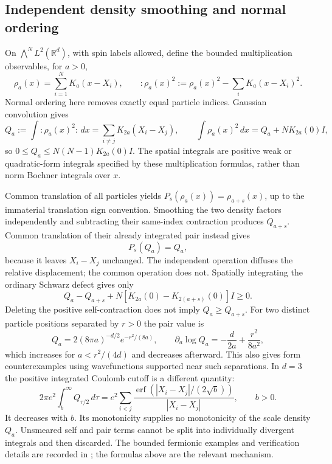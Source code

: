 \documentclass[11pt]{article}
\numberwithin{equation}{section}
\theoremstyle{definition}
\theoremstyle{remark}
\begin{document}
\subsection{Independent density smoothing and normal ordering}
On $\bigwedge^N L^2(\mathbb R^d)$, with spin labels allowed, define
the bounded multiplication observables, for $a>0$,
\begin{equation}
 \rho_a(x)=\sum_{i=1}^NK_a(x-X_i),\qquad
 :\rho_a(x)^2:=\rho_a(x)^2-\sum_i K_a(x-X_i)^2.
\end{equation}
Normal ordering here removes exactly equal particle indices.  Gaussian
convolution gives
\begin{equation}\label{eq:normal-pair-Q}
 Q_a:=\int:\rho_a(x)^2:\,dx
 =\sum_{i\ne j}K_{2a}(X_i-X_j),\qquad
 \int\rho_a(x)^2\,dx=Q_a+NK_{2a}(0)I,
\end{equation}
so $0\le Q_a\le N(N-1)K_{2a}(0)I$.  The spatial integrals are
positive weak or quadratic-form integrals specified by these
multiplication formulas, rather than norm Bochner integrals over $x$.

Common translation of all particles yields
$P_s(\rho_a(x))=\rho_{a+s}(x)$, up to the immaterial translation
sign convention.  Smoothing the two density factors independently
and subtracting their same-index contraction produces $Q_{a+s}$.
Common translation of their already integrated pair instead gives
\begin{equation}\label{eq:common-translation-pair}
 P_s(Q_a)=Q_a,
\end{equation}
because it leaves $X_i-X_j$ unchanged.  The independent operation
diffuses the relative displacement; the common operation does not.
Spatially integrating the ordinary Schwarz defect gives only
\begin{equation}\label{eq:normal-order-nonmonotonicity}
 Q_a-Q_{a+s}+N[K_{2a}(0)-K_{2(a+s)}(0)]I\ge0.
\end{equation}
Deleting the positive self-contraction does not imply $Q_a\ge Q_{a+s}$.
For two distinct particle positions separated by $r>0$ the pair value is
\begin{equation}
 Q_a=2(8\pi a)^{-d/2}e^{-r^2/(8a)},\qquad
 \partial_a\log Q_a=-\frac d{2a}+\frac{r^2}{8a^2},
\end{equation}
which increases for $a<r^2/(4d)$ and decreases afterward.  This also
gives form counterexamples using wavefunctions supported near such
separations.  In $d=3$ the positive integrated Coulomb cutoff is a
different quantity:
\begin{equation}\label{eq:coulomb-scale-cutoff}
 2\pi e^2\int_b^\infty Q_{\tau/2}\,d\tau
 =e^2\sum_{i<j}
 \frac{\operatorname{erf}(|X_i-X_j|/(2\sqrt b))}{|X_i-X_j|},
 \qquad b>0.
\end{equation}
It decreases with $b$.  Its monotonicity supplies no monotonicity of
the scale density $Q_a$.  Unsmeared self and pair terms cannot be
split into individually divergent integrals and then discarded.
The bounded fermionic examples and verification details are recorded
in \cite{smoothingnote}; the formulas above are the relevant mechanism.
\end{document}
